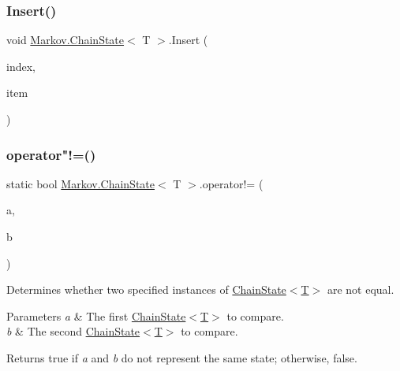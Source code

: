 \subsubsection{\texorpdfstring{Insert()}{Insert()}}
{\footnotesize\ttfamily void \mbox{\hyperlink{class_markov_1_1_chain_state}{Markov.\+Chain\+State}}$<$ T $>$.Insert (\begin{DoxyParamCaption}\item[{int}]{index,  }\item[{T}]{item }\end{DoxyParamCaption})}





\mbox{\label{class_markov_1_1_chain_state_a6461dd479522fd7d95f2e86a166187f4}} 
\subsubsection{\texorpdfstring{operator"!=()}{operator!=()}}
{\footnotesize\ttfamily static bool \mbox{\hyperlink{class_markov_1_1_chain_state}{Markov.\+Chain\+State}}$<$ T $>$.operator!= (\begin{DoxyParamCaption}\item[{\mbox{\hyperlink{class_markov_1_1_chain_state}{Chain\+State}}$<$ T $>$}]{a,  }\item[{\mbox{\hyperlink{class_markov_1_1_chain_state}{Chain\+State}}$<$ T $>$}]{b }\end{DoxyParamCaption})\hspace{0.3cm}{\ttfamily [static]}}



Determines whether two specified instances of \mbox{\hyperlink{class_markov_1_1_chain_state_a350f2699a1eb55d8b041ff394c6ae3d4}{Chain\+State$<$\+T$>$}} are not equal. 


\begin{DoxyParams}{Parameters}
{\em a} & The first \mbox{\hyperlink{class_markov_1_1_chain_state_a350f2699a1eb55d8b041ff394c6ae3d4}{Chain\+State$<$\+T$>$}} to compare.\\
\hline
{\em b} & The second \mbox{\hyperlink{class_markov_1_1_chain_state_a350f2699a1eb55d8b041ff394c6ae3d4}{Chain\+State$<$\+T$>$}} to compare.\\
\hline
\end{DoxyParams}
\begin{DoxyReturn}{Returns}
true if {\itshape a}  and {\itshape b}  do not represent the same state; otherwise, false.
\end{DoxyReturn}
\mbox{\label{class_markov_1_1_chain_state_a89707d9945ed200acc226df512001169}} 
